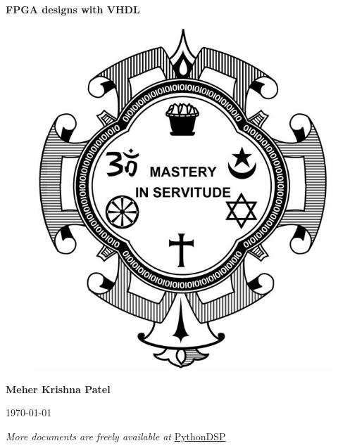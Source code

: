 \begin{titlepage}	
	\centering
	
	\vspace*{40mm} %
	\textbf{\Huge {FPGA designs with VHDL}}
	
	\vspace{0mm}
	\begin{figure}[!h]
		\centering
		\includegraphics[scale=0.3]{title-page/logo.jpg}
	\end{figure}
	
	\vspace{0mm} 
	\Large \textbf{{Meher Krishna Patel}}
	
	\small 	\today
	
	
	\vfill
	\small \textit{More documents are freely available at }{\href{http://pythondsp.readthedocs.io/en/latest/pythondsp/toc.html}{PythonDSP}}	
\end{titlepage}

